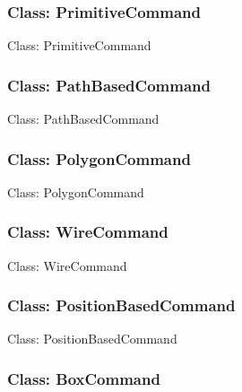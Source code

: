 \documentclass[11pt,twoside,openany,x11names,svgnames]{memoir}
\begin{document}
\subsubsection{Class: PrimitiveCommand}\label{Class-PrimitiveCommand}

Class: PrimitiveCommand

\subsubsection{Class: PathBasedCommand}\label{Class-PathBasedCommand}

Class: PathBasedCommand

\subsubsection{Class: PolygonCommand}\label{Class-PolygonCommand}

Class: PolygonCommand

\subsubsection{Class: WireCommand}\label{Class-WireCommand}

Class: WireCommand

\subsubsection{Class: PositionBasedCommand}\label{Class-PositionBasedCommand}

Class: PositionBasedCommand

\subsubsection{Class: BoxCommand}\label{Class-BoxCommand}
\end{document}
